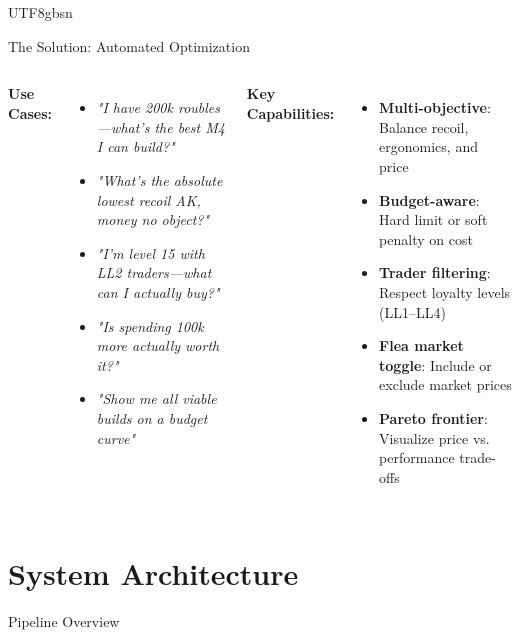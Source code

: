 \documentclass[aspectratio=169]{beamer}
\begin{document}
\begin{CJK*}{UTF8}{gbsn}
\begin{frame}{The Solution: Automated Optimization}
    \vspace{0.4cm}
    \begin{columns}
        \textbf{Use Cases:}
        \begin{itemize}
            \item \textit{"I have 200k roubles---what's the best M4 I can build?"}
            \item \textit{"What's the absolute lowest recoil AK, money no object?"}
            \item \textit{"I'm level 15 with LL2 traders---what can I actually buy?"}
            \item \textit{"Is spending 100k more actually worth it?"}
            \item \textit{"Show me all viable builds on a budget curve"}
        \end{itemize}

        \textbf{Key Capabilities:}
        \begin{itemize}
            \item \textbf{Multi-objective}: Balance recoil, ergonomics, and price
            \item \textbf{Budget-aware}: Hard limit or soft penalty on cost
            \item \textbf{Trader filtering}: Respect loyalty levels (LL1--LL4)
            \item \textbf{Flea market toggle}: Include or exclude market prices
            \item \textbf{Pareto frontier}: Visualize price vs. performance trade-offs
        \end{itemize}
    \end{columns}
\end{frame}

\section{System Architecture}

\begin{frame}{Pipeline Overview}
    \begin{center}
\end{center}
\end{frame}
\end{CJK*}
\end{document}
